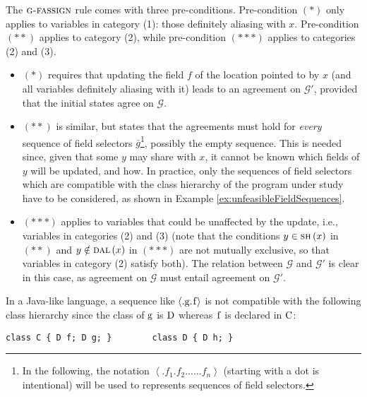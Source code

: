\documentclass[prodmode,acmtocl]{acmsmall}
\newcommand{\0}{\mbox{\bf 0}}
\newcommand{\CODE}[1]{\ensuremath{\mbox{\lstinline!#1!}\xspace}\xspace}
\def\AGREEM{\mathcal{G}}
\newcommand{\GRULENAME}[1]{\textsc{g-#1}}
\newcommand{\FSEQ}[1]{\left\langle #1 \right\rangle}
\newcommand{\SHARE}[1]{\textsc{sh}\left(#1\right)}
\newcommand{\DALIAS}[1]{\textsc{dal}\left(#1\right)}
\begin{document}
The $\GRULENAME{fassign}$ rule comes with three pre-conditions.
Pre-condition $({*})$ only applies to variables in category (1): those
definitely aliasing with $x$.  Pre-condition $({*}{*})$ applies to
category (2), while pre-condition $({*}{*}{*})$ applies to categories
(2) and (3).

\begin{itemize}
\item $({*})$ requires that updating the field $f$ of the location
  pointed to by $x$ (and all variables definitely aliasing with it)
  leads to an agreement on $\AGREEM'$, provided that the initial
  states agree on $\AGREEM$.
\item $({*}{*})$ is similar, but states that the agreements must hold
  for \emph{every} sequence of field selectors $\bar{g}$\footnote{In
    the following, the notation $\FSEQ{.f_1.f_2......f_n}$ (starting
    with a dot is intentional) will be used to represents sequences of
    field selectors.}, possibly the empty sequence.  This is needed
  since, given that some $y$ may share with $x$, it cannot be known
  which fields of $y$ will be updated, and how.  In practice, only the
  sequences of field selectors which are compatible with the class
  hierarchy of the program under study have to be considered, as shown
  in Example \ref{ex:unfeasibleFieldSequences}.
\item $({*}{*}{*})$ applies to variables that could be unaffected by
  the update, i.e., variables in categories (2) and (3) (note that the
  conditions $y \in \SHARE{x}$ in $({*}{*})$ and $y \notin \DALIAS{x}$
  in $({*}{*}{*})$ are not mutually exclusive, so that variables in
  category (2) satisfy both).  The relation between $\AGREEM$ and
  $\AGREEM'$ is clear in this case, as agreement on $\AGREEM$ must
  entail agreement on $\AGREEM'$.
\end{itemize}

\begin{example}
  \label{ex:unfeasibleFieldSequences}
  In a Java-like language, a sequence like
  $\FSEQ{.\mbox{\CODE{g}}.\mbox{\CODE{f}}}$ is not compatible with the
  following class hierarchy since the class of \CODE{g} is \CODE{D}
  whereas \CODE{f} is declared in \CODE{C}:
  \begin{center}
    \begin{lstlisting}[numbers=none]
   class C { D f; D g; }        class D { D h; }
    \end{lstlisting}
  \end{center}
\end{example}
\end{document}
